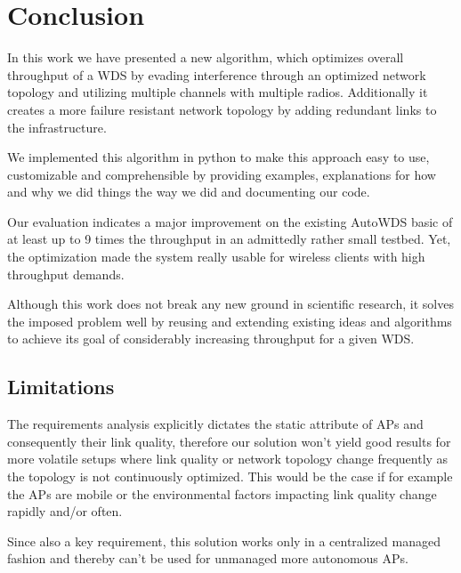 \chapter{Conclusion}
  In this work we have presented a new algorithm, which optimizes overall throughput of a \ac{WDS} by evading interference through an optimized network topology 
  and utilizing multiple channels with multiple radios. Additionally it creates a more failure resistant network topology by adding redundant links to the infrastructure.
  
  We implemented this algorithm in python to make this approach easy to use, customizable and comprehensible by providing examples, 
  explanations for how and why we did things the way we did and documenting our code.
  
  Our evaluation indicates a major improvement on the existing AutoWDS basic of at least up to 9 times the throughput in an admittedly rather small testbed.
  Yet, the optimization made the system really usable for wireless clients with high throughput demands.
  
  Although this work does not break any new ground in scientific research, it solves the imposed problem well by reusing and extending existing ideas and algorithms to
  achieve its goal of considerably increasing throughput for a given \ac{WDS}.
  
  \section{Limitations}
    The requirements analysis explicitly dictates the static attribute of APs and consequently their link quality, therefore our solution won't yield good 
    results for more volatile setups where link quality or network topology change frequently as the topology is not continuously optimized. 
    This would be the case if for example the APs are mobile or the environmental factors impacting link quality change rapidly and/or often.
    
    Since also a key requirement, this solution works only in a centralized managed fashion and thereby can't be used for unmanaged more autonomous APs.
    
